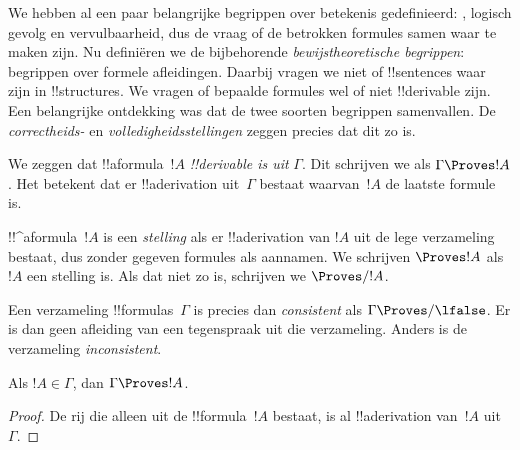 \documentclass[../../../include/open-logic-section]{subfiles}
\begin{document}
      {}
      {}


\begin{explain}
We hebben al een paar belangrijke begrippen over betekenis
gedefinieerd: , logisch gevolg en
vervulbaarheid, dus de vraag of de betrokken formules samen waar te
maken zijn. Nu definiëren we de bijbehorende
\emph{bewijstheoretische begrippen}: begrippen over formele
afleidingen. Daarbij vragen we niet of !!{sentence}s waar zijn in
!!{structure}s. We vragen of bepaalde formules wel of niet
!!{derivable} zijn. Een belangrijke ontdekking was dat de twee soorten
begrippen samenvallen. De \emph{correctheids-} en
\emph{volledigheidsstellingen} zeggen precies dat dit zo is.
\end{explain}

\begin{defn}[!!^{derivability}]
We zeggen dat !!a{formula}~$!A$ \emph{!!{derivable} is uit} $\Gamma$.
Dit schrijven we als $\Gamma \Proves !A$. Het betekent dat er
!!a{derivation} uit~$\Gamma$ bestaat waarvan~$!A$ de laatste formule
is.
\end{defn}

\begin{defn}[Stellingen]
!!^a{formula}~$!A$ is een \emph{stelling} als er !!a{derivation} van
$!A$ uit de lege verzameling bestaat, dus zonder gegeven formules als
aannamen. We schrijven $\Proves !A$ als $!A$ een stelling is. Als dat
niet zo is, schrijven we $\Proves/ !A$.
\end{defn}

\begin{defn}[Consistentie]
Een verzameling !!{formula}s~$\Gamma$ is precies dan
\emph{consistent} als $\Gamma\Proves/ \lfalse$. Er is dan geen
afleiding van een tegenspraak uit die verzameling. Anders is de
verzameling \emph{inconsistent}.
\end{defn}

\begin{prop}
Als $!A \in \Gamma$, dan $\Gamma \Proves !A$.
\end{prop}

\begin{proof}
  De rij die alleen uit de !!{formula}~$!A$ bestaat, is al
  !!a{derivation} van~$!A$ uit~$\Gamma$.
\end{proof}
\end{document}
